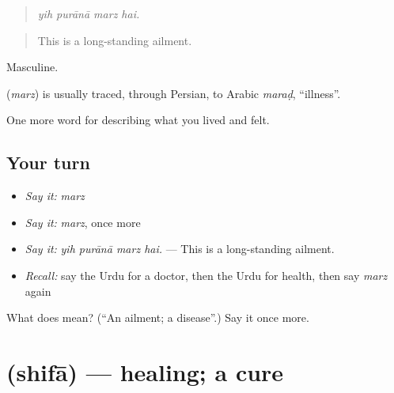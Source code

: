 \begin{quote}
   
\end{quote}

\begin{quote}
\emph{yih purānā marz hai.}
\end{quote}

\begin{quote}
This is a long-standing ailment.
\end{quote}

Masculine.

\begin{cousinweb}
\textbf{} (\emph{marz}) is usually traced, through Persian, to Arabic \emph{maraḍ}, \textquotedblleft{}illness\textquotedblright{}.
\end{cousinweb}

\begin{grammarlens}[title={What you've built}]
One more word for describing what you lived and felt.
\end{grammarlens}

\subsection*{Your turn}
\begin{itemize}
\raggedright
  \item \emph{Say it:} \emph{marz}
  \item \emph{Say it:} \emph{marz}, once more
  \item \emph{Say it:} \emph{yih purānā marz hai.} — This is a long-standing ailment.
  \item \emph{Recall:} say the Urdu for a doctor, then the Urdu for health, then say \emph{marz} again
\end{itemize}

\begin{tcolorbox}[breakable,colback=teal!4,colframe=teal!35!black,title={Before you move on}]
What does  mean? (\textquotedblleft{}An ailment; a disease\textquotedblright{}.) Say it once more.
\end{tcolorbox}
\section[\texorpdfstring{\ur{شفا} (shifā)}{شفا (shifā)}]{ (shifā) — healing; a cure}

\label{lesson:UR-C471-shifa}



